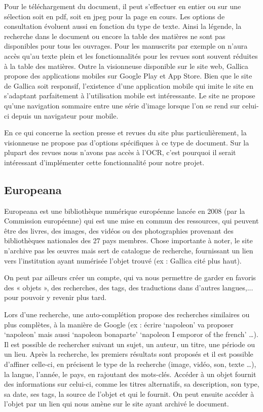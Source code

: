        Pour le téléchargement du document, il peut s’effectuer en entier ou sur une sélection soit en pdf,
       soit en jpeg pour la page en cours. Les options de consultation évoluent aussi en fonction du type de texte.
       Ainsi la légende, la recherche dans le document ou encore la table des matières ne sont pas disponibles
       pour tous les ouvrages. Pour les manuscrits par exemple on n’aura accès qu’au texte plein et les fonctionnalités
       pour les revues sont souvent réduites à la table des matières. Outre la visionneuse disponible sur le site web,
       Gallica propose des applications mobiles sur Google Play et App Store. Bien que le site de Gallica soit responsif,
       l'existence d’une application mobile qui imite le site en s’adaptant parfaitement à l’utilisation mobile est intéressante.
       Le site ne propose qu’une navigation sommaire entre une série d’image lorsque l’on se rend sur celui-ci depuis un navigateur pour mobile.

       En ce qui concerne la section presse et revues du site plus particulièrement, la visionneuse ne propose pas d’options
       spécifiques à ce type de document. Sur la plupart des revues nous n’avons pas accès à l’OCR, c’est pourquoi il serait
       intéressant d’implémenter cette fonctionnalité pour notre projet.

        \subsection{Europeana}
        \label{sec:europeana}
        Europeana est une bibliothèque numérique européenne lancée en 2008 (par la Commission européenne) qui est une mise
        en commun des ressources, qui peuvent être des livres, des images, des vidéos ou des photographies provenant
        des bibliothèques nationales des 27 pays membres. Chose importante à noter, le site n’archive pas les œuvres
        mais sert de catalogue de recherche, fournissant un lien vers l’institution ayant numérisée l’objet trouvé
        (ex : Gallica cité plus haut).

        On peut par ailleurs créer un compte, qui va nous permettre de garder en favoris des « objets », des recherches, des tags,
        des traductions dans d’autres langues,... pour pouvoir y revenir plus tard.

        Lors d’une recherche, une auto-complétion propose des recherches similaires ou plus complètes, à la manière de Google
        (ex : écrire ‘napoleon’ va proposer ‘napoleon’ mais aussi ‘napoleon bonaparte’ ‘napoleon I emporor of the french’ …).
        Il est possible de rechercher suivant un sujet, un auteur, un titre, une période ou un lieu. Après la recherche,
        les premiers résultats sont proposés et il est possible d’affiner celle-ci, en précisent le type de la recherche
        (image, vidéo, son, texte …), la langue, l'année, le pays, en rajoutant des mots-clés. Accéder à un objet fournit
        des informations sur celui-ci, comme les titres alternatifs, sa description, son type, sa date, ses tags,
        la source de l’objet et qui le fournit. On peut ensuite accéder à l’objet par un lien qui nous amène sur le site ayant archivé le document.

